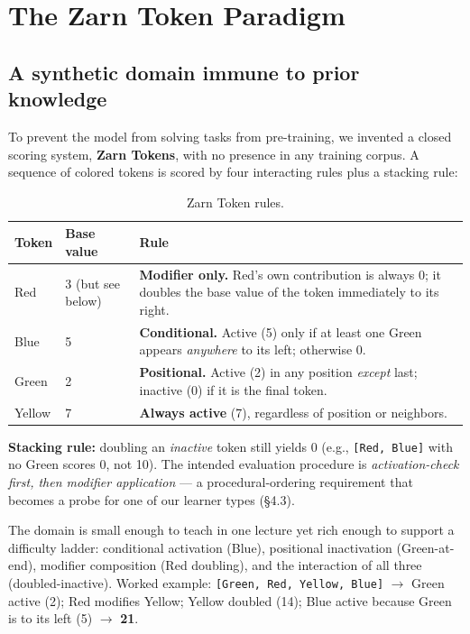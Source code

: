 \documentclass[11pt]{article}
\begin{document}
\section{The Zarn Token Paradigm}

\subsection{A synthetic domain immune to prior knowledge}

To prevent the model from solving tasks from pre-training, we invented a closed
scoring system, \textbf{Zarn Tokens}, with no presence in any training corpus.  A
sequence of colored tokens is scored by four interacting rules plus a stacking rule:

\begin{table}[h]
\centering
\caption{Zarn Token rules.}
\label{tab:zarn-rules}
\begin{tabular}{@{}llp{7cm}@{}}
\toprule
Token & Base value & Rule \\
\midrule
Red    & 3 (but see below) & \textbf{Modifier only.} Red's own contribution is always 0; it doubles the base value of the token immediately to its right. \\
Blue   & 5 & \textbf{Conditional.} Active (5) only if at least one Green appears \emph{anywhere} to its left; otherwise 0. \\
Green  & 2 & \textbf{Positional.} Active (2) in any position \emph{except} last; inactive (0) if it is the final token. \\
Yellow & 7 & \textbf{Always active} (7), regardless of position or neighbors. \\
\bottomrule
\end{tabular}
\end{table}

\textbf{Stacking rule:} doubling an \emph{inactive} token still yields 0 (e.g.,
\texttt{[Red, Blue]} with no Green scores 0, not 10).  The intended evaluation
procedure is \emph{activation-check first, then modifier application} --- a
procedural-ordering requirement that becomes a probe for one of our learner types
(\S4.3).

The domain is small enough to teach in one lecture yet rich enough to support a
difficulty ladder: conditional activation (Blue), positional inactivation
(Green-at-end), modifier composition (Red doubling), and the interaction of all three
(doubled-inactive).  Worked example: \texttt{[Green, Red, Yellow, Blue]} $\to$ Green
active (2); Red modifies Yellow; Yellow doubled (14); Blue active because Green is to
its left (5) $\to$ \textbf{21}.
\end{document}
